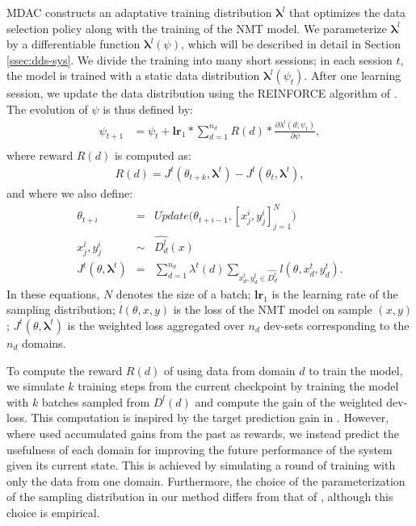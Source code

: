 \documentclass[11pt]{article}
\newcommand{\vlambda}{\ensuremath{\boldsymbol\lambda}\xspace} %
\begin{document}
MDAC constructs an adaptative training distribution $\vlambda^{l}$ that optimizes the data selection policy along with the training of the NMT model. We parameterize $\vlambda^{l}$ by a differentiable function $\vlambda^l(\psi)$, which will be described in detail in Section \ref{ssec:dds-sys}. We divide the training into many short sessions; in each session $t$, the model is trained with a static data distribution $\vlambda^{l}(\psi_t)$. After one learning session, we update the data distribution using the REINFORCE algorithm of \citet{Williams92simple}. The evolution of $\psi$ is thus defined by:
\begin{align*}
\psi_{t+1} &= \psi_t + \mathbf{lr}_{1} * \displaystyle{\mathop{\sum}_{d=1}^{n_d}} R(d) * \frac{\partial \lambda^l(d;\psi_t)}{\partial \psi}, \\
\end{align*}
\begingroup
\allowdisplaybreaks
where reward $R(d)$ is computed as:
\begin{align*}
  R(d) = J^t(\theta_{t+k},\vlambda^t) - J^t(\theta_t,\vlambda^t),
\end{align*}
and where we also define:
\begin{equation}
\begin{array}{rcl}
\theta_{t+i} &=& Update\big(\theta_{t+i-1},[x^i_j,y^i_j]_{j=1}^N\big) \\ \nonumber
x^i_j, y^i_j &\sim& \widehat{D^l_d}(x) \\
J^t(\theta,\vlambda^t) &=& \displaystyle{\mathop{\sum}_{d=1}^{n_d}}\lambda^t(d)\displaystyle{\mathop{\sum}_{x^t_d,y^t_d \in \widehat{D^t_d}}} l(\theta,x^t_d,y^t_d).
\end{array}
\end{equation}
\endgroup
In these equations, $N$ denotes the size of a batch; $\mathbf{lr}_{1}$ is the learning rate of the sampling distribution; $l(\theta,x,y)$ is the loss of the NMT model on sample $(x,y)$; $J^t(\theta,\vlambda^t)$ is the weighted loss aggregated over $n_d$ dev-sets corresponding to the $n_d$ domains.

To compute the reward $R(d)$ of using data from domain $d$ to train the model, we simulate $k$ training steps from the current checkpoint by training the model with $k$ batches sampled from $D^l(d)$ and compute the gain of the weighted dev-loss. This computation is inspired by the target prediction gain in \citet{Graves17automated}. However, where \citet{Graves17automated} used accumulated gains from the past as rewards, we instead predict the usefulness of each domain for improving the future performance of the system given its current state. This is achieved by simulating a round of training with only the data from one domain. Furthermore, the choice of the parameterization of the sampling distribution in our method differs from that of \citet{Graves17automated}, although this choice is empirical.
\end{document}
